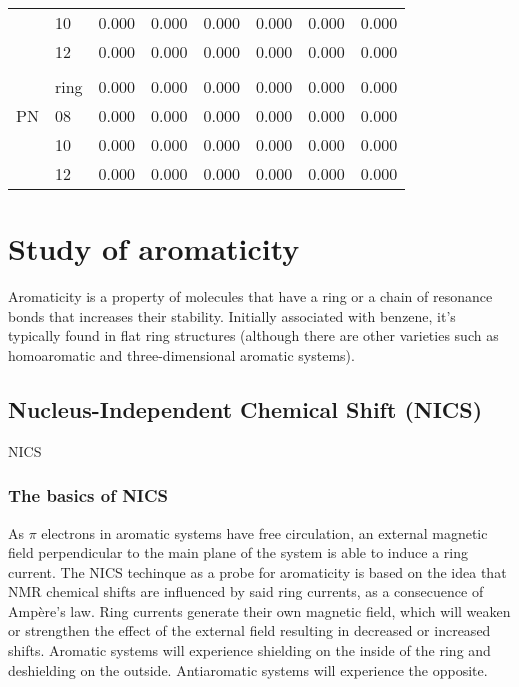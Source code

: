 \begin{table}
\begin{tabular}{@{}rlcccccc@{}}
        & 10 & 0.000 & 0.000 & 0.000 & 0.000 & 0.000 & 0.000 \\
        & 12 & 0.000 & 0.000 & 0.000 & 0.000 & 0.000 & 0.000 \\
        \\
        \multirow{3}{*}{PN} & ring & 0.000 & 0.000 & 0.000 & 0.000 & 0.000 & 0.000 \\
        & 08 & 0.000 & 0.000 & 0.000 & 0.000 & 0.000 & 0.000 \\
        & 10 & 0.000 & 0.000 & 0.000 & 0.000 & 0.000 & 0.000 \\
        & 12 & 0.000 & 0.000 & 0.000 & 0.000 & 0.000 & 0.000 \\
        \bottomrule
    \end{tabular}
\end{table}

\section{Study of aromaticity}

Aromaticity is a property of molecules that have a ring or a chain of resonance bonds that increases their stability.
Initially associated with benzene, it’s typically found in flat ring structures (although there are other varieties such as homoaromatic and three-dimensional aromatic systems).

\subsection{Nucleus-Independent Chemical Shift (NICS)}

NICS

\subsubsection{The basics of NICS}

As $\pi$ electrons in aromatic systems have free circulation, an external magnetic field perpendicular to the main plane of the system is able to induce a ring current.
The NICS techinque as a probe for aromaticity is based on the idea that NMR chemical shifts are influenced by said ring currents, as a consecuence of Ampère’s law.
Ring currents generate their own magnetic field, which will weaken or strengthen the effect of the external field resulting in decreased or increased shifts.
Aromatic systems will experience shielding on the inside of the ring and deshielding on the outside.
Antiaromatic systems will experience the opposite.

